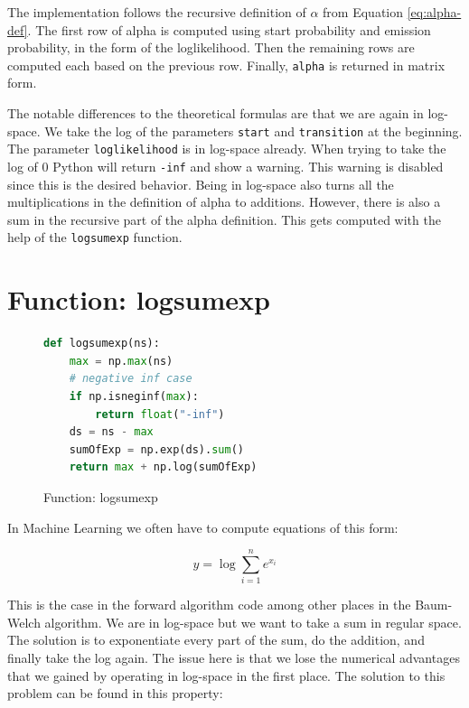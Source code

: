 The implementation follows the recursive definition of $\alpha$ from Equation \eqref{eq:alpha-def}. The first row of alpha is computed using start probability and emission probability, in the form of the loglikelihood. Then the remaining rows are computed each based on the previous row. Finally, \texttt{alpha} is returned in matrix form. 

The notable differences to the theoretical formulas are that we are again in log-space. We take the log of the parameters \texttt{start} and \texttt{transition} at the beginning. The parameter \texttt{loglikelihood} is in log-space already. When trying to take the log of 0 Python will return \texttt{-inf} and show a warning. This warning is disabled since this is the desired behavior. Being in log-space also turns all the multiplications in the definition of alpha to additions. However, there is also a sum in the recursive part of the alpha definition. This gets computed with the help of the \texttt{logsumexp} function. 

\section{Function: logsumexp}

\begin{figure}
\begin{singlespace}
\begin{lstlisting}[language=Python]
def logsumexp(ns):
    max = np.max(ns)
    # negative inf case
    if np.isneginf(max):
        return float("-inf")
    ds = ns - max
    sumOfExp = np.exp(ds).sum()
    return max + np.log(sumOfExp)

\end{lstlisting}
\end{singlespace}
\caption{Function: logsumexp}    
\label{fig:logsumexp-listing}
\end{figure}

In Machine Learning we often have to compute equations of this form: 

\begin{equation}
y=\log \sum_{i=1}^{n} e^{x_{i}}
\end{equation}

This is the case in the forward algorithm code among other places in the Baum-Welch algorithm. We are in log-space but we want to take a sum in regular space. The solution is to exponentiate every part of the sum, do the addition, and finally take the log again. The issue here is that we lose the numerical advantages that we gained by operating in log-space in the first place. The solution to this problem can be found in this property:

